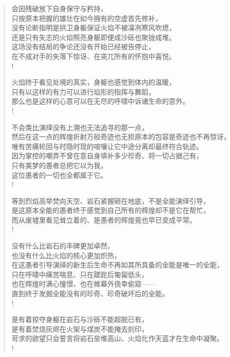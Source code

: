 \documentclass[UTF8, 12pt, a4paper]{ctexrep} %
\begin{document}
\begin{verse}
会因残破放下自身保守与矜持，\\
只按原本把握的雄壮在如今拥有的空虚首先修补，\\
没有论断指明是拱卫身躯保证火焰不被凜冽寒风吹熄，\\
还是只有矢志的火焰照亮身躯即便成沙砾也聚拢成堆。\\
这场没有结局的争论还没有开始已经被告停止，\\
在不成对手的失落下惊讶、在突兀所有的怀抱中喜悦。\\!

火焰终于看见处境的真实，身躯也感觉到体内的温暖，\\
只有以这样的有力可以进行焰形的指挥与舞蹈，\\
那么也是这样的心意可以在无尽的呼啸中诉诸生命的意外。\\!

不会类比演绎没有上溯也无法追寻的那一点，\\
然后在这一点的辉煌折射万般奇迹也无损原本的包容是奇迹也不再惊讶，\\
唯有苦痛轮回与时隐时现的喧嚷让它中途分离却最终符合轨迹。\\
因为掌控的嘲弄不曾在意自身填补多少珍奇、将一切占据己有，\\
只有美梦的愚者总把它以为我，\\
这位愚者的一切也全都属于它。\\!

等到烈焰高举焚向天空、岩石紧握砸在地底，不是全能演绎引导，\\
是这原本全能的愚者终于感觉到自己所有的辉煌却不是它在帮忙，\\
而从废墟里看见耸立着的、是愚者的辉煌竟也早已变成平常。\\!

没有什么比岩石的丰碑更加卓然，\\
也没有什么比火焰的核心更加炽热，\\
在这愚者引导演绎的新生后生命不再如其所具备的全能是唯一的全能，\\
只在呼啸中痛苦喘息、只在蹉跎后匍匐低头，\\
也在辉煌时满心憧憬、也在帷幕外侥幸偷窥——\\
直到终于发掘全能没有的珍奇、珍奇破坏后的全能。\\!

是有着掠夺身躯在岩石与沙砾不能超脱已有，\\
是有着焚烧灰烬在火架与煤炭不能掩去刻印，\\
苛求的欲望只会誓言将岩石垒堆高山、火焰化作天蓝才在生命中凝聚。\\!


\end{verse}
\end{document}
